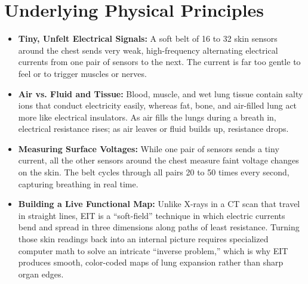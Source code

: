 \section{Underlying Physical Principles}
\begin{itemize}
    \item \textbf{Tiny, Unfelt Electrical Signals:} A soft belt of 16 to 32 skin sensors around the chest sends very weak, high-frequency alternating electrical currents from one pair of sensors to the next. The current is far too gentle to feel or to trigger muscles or nerves.
    \item \textbf{Air vs. Fluid and Tissue:} Blood, muscle, and wet lung tissue contain salty ions that conduct electricity easily, whereas fat, bone, and air-filled lung act more like electrical insulators. As air fills the lungs during a breath in, electrical resistance rises; as air leaves or fluid builds up, resistance drops.
    \item \textbf{Measuring Surface Voltages:} While one pair of sensors sends a tiny current, all the other sensors around the chest measure faint voltage changes on the skin. The belt cycles through all pairs 20 to 50 times every second, capturing breathing in real time.
    \item \textbf{Building a Live Functional Map:} Unlike X-rays in a CT scan that travel in straight lines, EIT is a ``soft-field'' technique in which electric currents bend and spread in three dimensions along paths of least resistance. Turning those skin readings back into an internal picture requires specialized computer math to solve an intricate ``inverse problem,'' which is why EIT produces smooth, color-coded maps of lung expansion rather than sharp organ edges.
\end{itemize}


